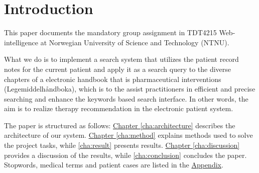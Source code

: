 \chapter{Introduction}
This paper documents the mandatory group assignment in TDT4215 Web-intelligence
at Norwegian University of Science and Technology (NTNU).

What we do is to implement a search system that utilizes the patient record notes for the current patient and apply it as a search query to the diverse chapters of a electronic  handbook that is pharmaceutical interventions (Legemiddelhåndboka), which is to the assist practitioners in efficient and precise searching  and  enhance the keywords based search interface. In other words, the aim is to realize therapy recommendation in the electronic patient system.

The paper is structured as follows:
\hyperref[cha:architecture]{Chapter \ref*{cha:architecture}} describes the
architecture of our system.
\hyperref[cha:method]{Chapter \ref*{cha:method}} explains methods used to
solve the project tasks, while \autoref{cha:result} presents results.
\hyperref[cha:discussion]{Chapter \ref*{cha:discussion}} provides a discussion
of the results, while \autoref{cha:conclusion} concludes the paper.
Stopwords, medical terms and patient cases are listed in the
\hyperref[appendix]{Appendix}.
